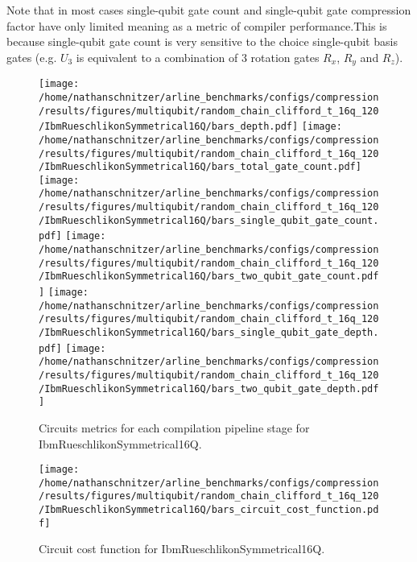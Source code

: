 \documentclass{report}%
\begin{document}
%
Note that in most cases single-qubit gate count and single-qubit gate compression factor
                have only limited meaning as a metric of compiler performance.This is because single-qubit
                gate count is very sensitive to the choice single-qubit basis gates (e.g. $U_3$ is
                equivalent to a combination of 3 rotation gates $R_x$, $R_y$ and $R_z$).%


\begin{figure}[h!]%
\centering%
\texttt{[image: /home/nathanschnitzer/arline\_benchmarks/configs/compression/results/figures/multiqubit/random\_chain\_clifford\_t\_16q\_120/IbmRueschlikonSymmetrical16Q/bars\_depth.pdf]}%
\centering%
\texttt{[image: /home/nathanschnitzer/arline\_benchmarks/configs/compression/results/figures/multiqubit/random\_chain\_clifford\_t\_16q\_120/IbmRueschlikonSymmetrical16Q/bars\_total\_gate\_count.pdf]}%
\linebreak%
\centering%
\texttt{[image: /home/nathanschnitzer/arline\_benchmarks/configs/compression/results/figures/multiqubit/random\_chain\_clifford\_t\_16q\_120/IbmRueschlikonSymmetrical16Q/bars\_single\_qubit\_gate\_count.pdf]}%
\centering%
\texttt{[image: /home/nathanschnitzer/arline\_benchmarks/configs/compression/results/figures/multiqubit/random\_chain\_clifford\_t\_16q\_120/IbmRueschlikonSymmetrical16Q/bars\_two\_qubit\_gate\_count.pdf]}%
\linebreak%
\centering%
\texttt{[image: /home/nathanschnitzer/arline\_benchmarks/configs/compression/results/figures/multiqubit/random\_chain\_clifford\_t\_16q\_120/IbmRueschlikonSymmetrical16Q/bars\_single\_qubit\_gate\_depth.pdf]}%
\centering%
\texttt{[image: /home/nathanschnitzer/arline\_benchmarks/configs/compression/results/figures/multiqubit/random\_chain\_clifford\_t\_16q\_120/IbmRueschlikonSymmetrical16Q/bars\_two\_qubit\_gate\_depth.pdf]}%
\linebreak%
\caption{Circuits metrics for each compilation pipeline stage for IbmRueschlikonSymmetrical16Q.}%
\end{figure}

%


\begin{figure}[h!]%
\centering%
\texttt{[image: /home/nathanschnitzer/arline\_benchmarks/configs/compression/results/figures/multiqubit/random\_chain\_clifford\_t\_16q\_120/IbmRueschlikonSymmetrical16Q/bars\_circuit\_cost\_function.pdf]}%
\caption{Circuit cost function for IbmRueschlikonSymmetrical16Q.}%
\end{figure}
\end{document}
